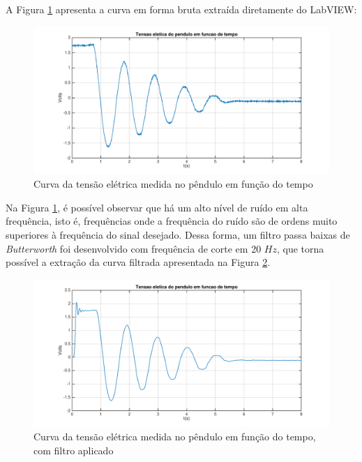 \documentclass[a4paper]{instrumentacao}
\begin{document}
A Figura \ref{fig:pendulo-curva-tensao-vs-tempo} apresenta a curva em forma bruta extraída diretamente do LabVIEW:

\begin{figure}[H]
\centering
\includegraphics[width=\textwidth]{time-plot-raw.pdf}
\caption{Curva da tensão elétrica medida no pêndulo em função do tempo}
\label{fig:pendulo-curva-tensao-vs-tempo}
\end{figure}

Na Figura \ref{fig:pendulo-curva-tensao-vs-tempo}, é possível observar que há um alto nível de ruído em alta frequência, isto é, frequências onde a frequência do ruído são de ordens muito superiores à frequência do sinal desejado. Dessa forma, um filtro passa baixas de \textit{Butterworth} foi desenvolvido com frequência de corte em 20 $Hz$, que torna possível a extração da curva filtrada apresentada na Figura \ref{fig:pendulo-curva-tensao-vs-tempo-filtrado}.

\begin{figure}[H]
\centering
\includegraphics[width=\textwidth]{time-plot.pdf}
\caption{Curva da tensão elétrica medida no pêndulo em função do tempo, com filtro aplicado}
\label{fig:pendulo-curva-tensao-vs-tempo-filtrado}
\end{figure}
\end{document}
